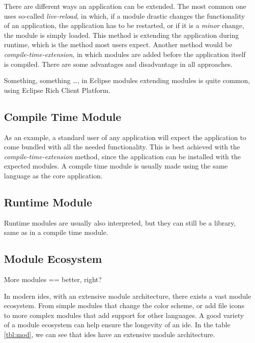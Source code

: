There are different ways an application can be extended. The most common one
uses so-called \textit{live-reload}, in which, if a module drastic changes the
functionality of an application, the application has to be restarted, or if it
is a \textit{minor} change, the module is simply loaded. This method is
extending the application during runtime, which is the method most users
expect. Another method would be \textit{compile-time-extension}, in which
modules are added before the application itself is compiled. There are some
advantages and disadvantage in all approaches.

Something, something \dots, in Eclipse modules extending modules is quite
common, using Eclipse Rich Client Platform. \cite{eclipseRcp}

\subsection{Compile Time Module}

As an example, a standard user of any application will expect the application to
come bundled with all the needed functionality. This is best achieved with the
\textit{compile-time-extension} method, since the application can be installed
with the expected modules. A compile time module is usually made using the same
language as the core application.

\subsection{Runtime Module}


Runtime modules are usually also interpreted, but they can still be a
library, same as in a compile time module.

\subsection{Module Ecosystem}

More modules == better, right?

In modern \gls{ide}s, with an extensive module architecture, there exists a
vast module ecosystem. From simple modules that change the color scheme, or
add file icons to more complex modules that add support for other languages.
A good variety of a module ecosystem can help ensure the longevity of an
\gls{ide}. In the table \ref{tbl:mod}, we can see that \gls{ide}s have an
extensive module architecture. \footnotemark

